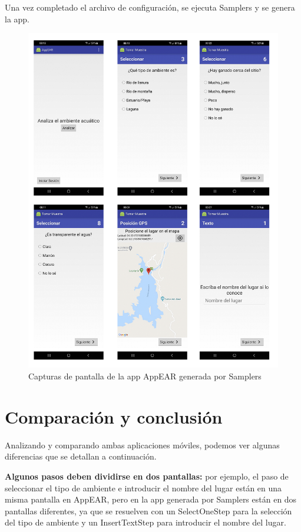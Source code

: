 Una vez completado el archivo de configuración, se ejecuta Samplers y se genera la app.

\begin{figure}[H]
  \centering
   \includegraphics[scale=0.5]{06-caso_de_uso/capturas_appear_samplers.png} 
    \caption{Capturas de pantalla de la app AppEAR generada por Samplers}
\end{figure}

\section{Comparación y conclusión}
Analizando y comparando ambas aplicaciones móviles, podemos ver algunas diferencias que se detallan a continuación.


\textbf{Algunos pasos deben dividirse en dos pantallas:} por ejemplo, el paso de seleccionar el tipo de ambiente e introducir el nombre del lugar están en una misma pantalla en AppEAR, pero en la app generada por Samplers están en dos pantallas diferentes, ya que se resuelven con un SelectOneStep para la selección del tipo de ambiente y un InsertTextStep para introducir el nombre del lugar.

